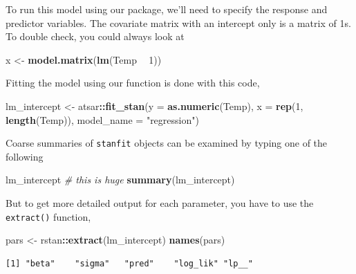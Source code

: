 \documentclass[
]{article}
\newenvironment{Shaded}{\begin{snugshade}}{\end{snugshade}}
\newcommand{\CommentTok}[1]{\textcolor[rgb]{0.56,0.35,0.01}{\textit{#1}}}
\newcommand{\DataTypeTok}[1]{\textcolor[rgb]{0.13,0.29,0.53}{#1}}
\newcommand{\DecValTok}[1]{\textcolor[rgb]{0.00,0.00,0.81}{#1}}
\newcommand{\KeywordTok}[1]{\textcolor[rgb]{0.13,0.29,0.53}{\textbf{#1}}}
\newcommand{\NormalTok}[1]{#1}
\newcommand{\OperatorTok}[1]{\textcolor[rgb]{0.81,0.36,0.00}{\textbf{#1}}}
\newcommand{\StringTok}[1]{\textcolor[rgb]{0.31,0.60,0.02}{#1}}
\begin{document}
To run this model using our package, we'll need to specify the response
and predictor variables. The covariate matrix with an intercept only is
a matrix of 1s. To double check, you could always look at

\begin{Shaded}
\begin{Highlighting}[]
\NormalTok{x <-}\StringTok{ }\KeywordTok{model.matrix}\NormalTok{(}\KeywordTok{lm}\NormalTok{(Temp }\OperatorTok{~}\StringTok{ }\DecValTok{1}\NormalTok{))}
\end{Highlighting}
\end{Shaded}

Fitting the model using our function is done with this code,

\begin{Shaded}
\begin{Highlighting}[]
\NormalTok{lm_intercept <-}\StringTok{ }\NormalTok{atsar}\OperatorTok{::}\KeywordTok{fit_stan}\NormalTok{(}\DataTypeTok{y =} \KeywordTok{as.numeric}\NormalTok{(Temp), }\DataTypeTok{x =} \KeywordTok{rep}\NormalTok{(}\DecValTok{1}\NormalTok{, }
    \KeywordTok{length}\NormalTok{(Temp)), }\DataTypeTok{model_name =} \StringTok{"regression"}\NormalTok{)}
\end{Highlighting}
\end{Shaded}

Coarse summaries of \texttt{stanfit} objects can be examined by typing
one of the following

\begin{Shaded}
\begin{Highlighting}[]
\NormalTok{lm_intercept}
\CommentTok{# this is huge}
\KeywordTok{summary}\NormalTok{(lm_intercept)}
\end{Highlighting}
\end{Shaded}

But to get more detailed output for each parameter, you have to use the
\texttt{extract()} function,

\begin{Shaded}
\begin{Highlighting}[]
\NormalTok{pars <-}\StringTok{ }\NormalTok{rstan}\OperatorTok{::}\KeywordTok{extract}\NormalTok{(lm_intercept)}
\KeywordTok{names}\NormalTok{(pars)}
\end{Highlighting}
\end{Shaded}

\begin{verbatim}
[1] "beta"    "sigma"   "pred"    "log_lik" "lp__"   
\end{verbatim}
\end{document}
